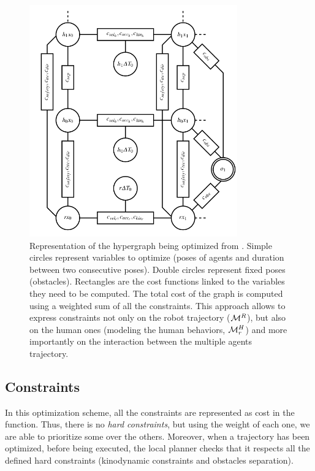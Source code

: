 \documentclass[a4paper,11pt,twoside]{StyleThese}
\begin{document}
\begin{figure}[hbtp]
\centering
\includegraphics[width=0.8\textwidth]{figures/chapter2/hateb_graph.png}
\caption{Representation of the hypergraph being optimized from \cite{khambhaita_viewing_2017}. Simple circles represent variables to optimize (poses of agents and duration between two consecutive poses). Double circles represent fixed poses (obstacles). Rectangles are the cost functions linked to the variables they need to be computed. The total cost of the graph is computed using a weighted sum of all the constraints. This approach allows to express constraints not only on the robot trajectory ($\mathcal{M}^R$), but also on the human ones (modeling the human behaviors, $\mathcal{M}^H_r$) and more importantly on the interaction between the multiple agents trajectory.}
\label{fig:hateb_graph}
\end{figure}


\subsection{Constraints}
In this optimization scheme, all the constraints are represented as cost in the function. Thus, there is no \textit{hard constraints}, but using the weight of each one, we are able to prioritize some over the others. Moreover, when a trajectory has been optimized, before being executed, the local planner checks that it respects all the defined hard constraints (kinodynamic constraints and obstacles separation).
\end{document}
